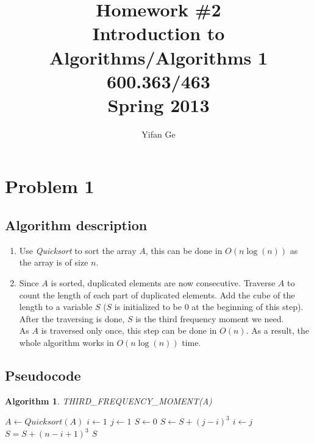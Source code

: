 \documentclass[letterpaper, 11pt]{article}
\newtheorem{algorithm}[lemma]{Algorithm}
\begin{document}
\title{Homework \#2 \\ Introduction to Algorithms/Algorithms 1 \\ 600.363/463 \\ Spring 2013}
\author{Yifan Ge}


\maketitle



\section{Problem 1}
\subsection{Algorithm description}
\begin{enumerate}
\item Use \textit{Quicksort} to sort the array $A$, this can be done in $O(n\log(n))$ as the array is of size $n$.
\item Since $A$ is sorted, duplicated elements are now consecutive. Traverse $A$ to count the length of each part of duplicated elements. Add the cube of the length to a variable $S$ ($S$ is initialized to be $0$ at the beginning of this step). After the traversing is done, $S$ is the third frequency moment we need. \\As $A$ is traversed only once, this step can be done in $O(n)$. As a result, the whole algorithm works in $O(n\log(n))$ time.
\end{enumerate}

\subsection{Pseudocode}
\begin{algorithm}
\caption{THIRD\_FREQUENCY\_MOMENT(A)}
\begin{algorithmic}[1]
\STATE $A \leftarrow Quicksort(A)$
\STATE $i \leftarrow 1$
\STATE $j \leftarrow 1$
\STATE $S \leftarrow 0$
        \STATE $S \leftarrow S + (j-i)^3$
        \STATE $i \leftarrow j$
    \ENDIF
\ENDFOR
\STATE $S = S + (n - i + 1)^3$
\RETURN $S$
\end{algorithmic}
\end{algorithm}
\end{document}
